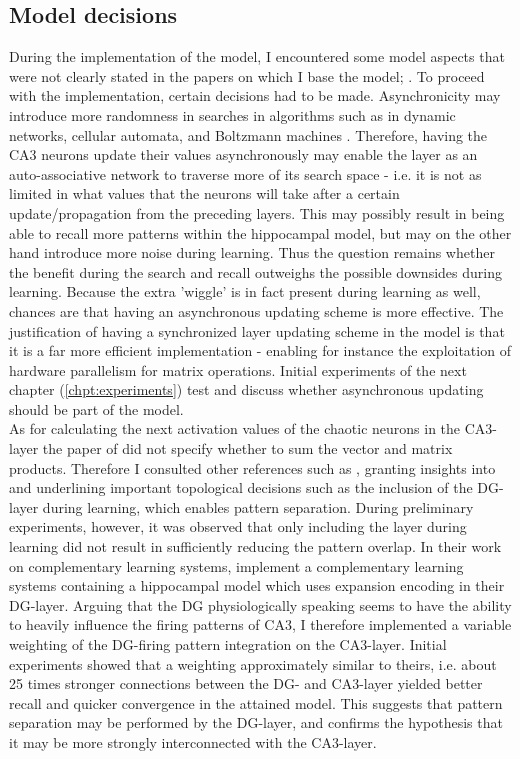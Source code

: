 \subsection{Model decisions}

During the implementation of the model, I encountered some model aspects that were not clearly stated in the papers on which I base the model; \citep{Hattori2014, Hattori2010}. To proceed with the implementation, certain decisions had to be made.
Asynchronicity may introduce more randomness in searches in algorithms such as in dynamic networks, cellular automata, and Boltzmann machines \citep{Bar-yam1997}. Therefore, having the CA3 neurons update their values asynchronously may enable the layer as an auto-associative network to traverse more of its search space - i.e. it is not as limited in what values that the neurons will take after a certain update/propagation from the preceding layers. This may possibly result in being able to recall more patterns within the hippocampal model, but may on the other hand introduce more noise during learning. Thus the question remains whether the benefit during the search and recall outweighs the possible downsides during learning. Because the extra 'wiggle' is in fact present during learning as well, chances are that having an asynchronous updating scheme is more effective.
The justification of having a synchronized layer updating scheme in the model is that it is a far more efficient implementation - enabling for instance the exploitation of hardware parallelism for matrix operations. Initial experiments of the next chapter (\ref{chpt:experiments}) test and discuss whether asynchronous updating should be part of the model.
\\

As for calculating the next activation values of the chaotic neurons in the CA3-layer the paper of \cite{Hattori2014} did not specify whether to sum the vector and matrix products. Therefore I consulted other references such as \citep{Wakagi2008}, granting insights into and underlining important topological decisions such as the inclusion of the DG-layer during learning, which enables pattern separation. During preliminary experiments, however, it was observed that only including the layer during learning did not result in sufficiently reducing the pattern overlap.
In their work on complementary learning systems, \cite{Norman2003} implement a complementary learning systems containing a hippocampal model which uses expansion encoding in their DG-layer. Arguing that the DG physiologically speaking seems to have the ability to heavily influence the firing patterns of CA3, I therefore implemented a variable weighting of the DG-firing pattern integration on the CA3-layer. Initial experiments showed that a weighting approximately similar to theirs, i.e. about 25 times stronger connections between the DG- and CA3-layer yielded better recall and quicker convergence in the attained model. This suggests that pattern separation may be performed by the DG-layer, and confirms the hypothesis that it may be more strongly interconnected with the CA3-layer.

